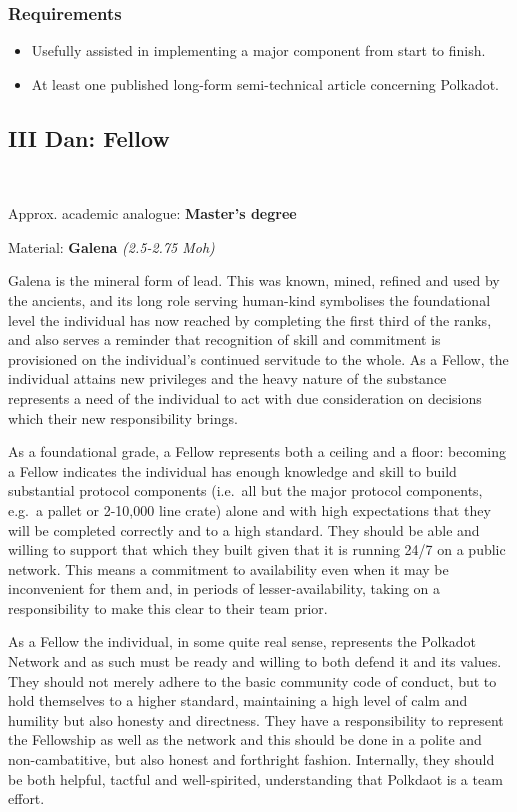 \documentclass[9pt,oneside]{amsart}
\begin{document}
\subsubsection{Requirements}\label{requirements-1}

\begin{itemize}
\item Usefully assisted in implementing a major component from start to finish.
\item At least one published long-form semi-technical article concerning Polkadot.
\end{itemize}

\subsection{III Dan: Fellow}\label{iii-dan-fellow}~\\


Approx. academic analogue: \textbf{Master's degree}

Material: \textbf{Galena} \emph{(2.5-2.75 Moh)}

Galena is the mineral form of lead. This was known, mined, refined and used by the ancients, and its long role serving human-kind symbolises the foundational level the individual has now reached by completing the first third of the ranks, and also serves a reminder that recognition of skill and commitment is provisioned on the individual's continued servitude to the whole. As a Fellow, the individual attains new privileges and the heavy nature of the substance represents a need of the individual to act with due consideration on decisions which their new responsibility brings.

As a foundational grade, a Fellow represents both a ceiling and a floor: becoming a Fellow indicates the individual has enough knowledge and skill to build substantial protocol components (i.e.~all but the major protocol components, e.g.~a pallet or 2-10,000 line crate) alone and with high expectations that they will be completed correctly and to a high standard. They should be able and willing to support that which they built given that it is running 24/7 on a public network. This means a commitment to availability even when it may be inconvenient for them and, in periods of lesser-availability, taking on a responsibility to make this clear to their team prior.

As a Fellow the individual, in some quite real sense, represents the Polkadot Network and as such must be ready and willing to both defend it and its values. They should not merely adhere to the basic community code of conduct, but to hold themselves to a higher standard, maintaining a high level of calm and humility but also honesty and directness. They have a responsibility to represent the Fellowship as well as the network and this should be done in a polite and non-cambatitive, but also honest and forthright fashion. Internally, they should be both helpful, tactful and well-spirited, understanding that Polkdaot is a team effort.
\end{document}
